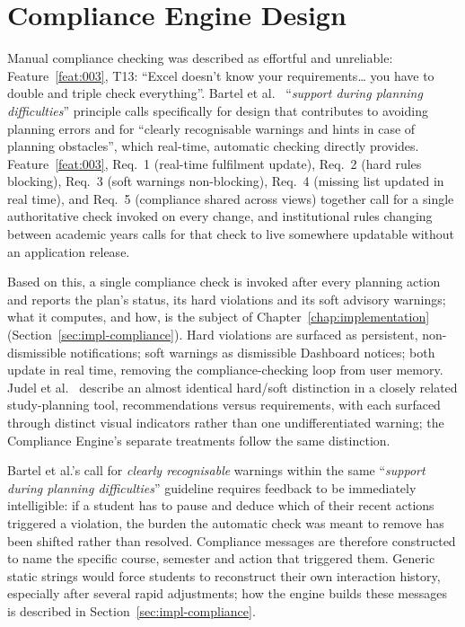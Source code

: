 \section{Compliance Engine Design}
\label{sec:compliance}
Manual compliance checking was described as effortful and unreliable: Feature~\ref{feat:003}, T13: \enquote{Excel doesn't know your requirements… you have to double and triple check everything}. Bartel et al.~\cite{bartel_design_2024} \enquote{\emph{support during planning difficulties}} principle calls specifically for design that contributes to avoiding planning errors and for \enquote{clearly recognisable warnings and hints in case of planning obstacles}, which real-time, automatic checking directly provides. Feature~\ref{feat:003}, Req.~1 (real-time fulfilment update), Req.~2 (hard rules blocking), Req.~3 (soft warnings non-blocking), Req.~4 (missing list updated in real time), and Req.~5 (compliance shared across views) together call for a single authoritative check invoked on every change, and institutional rules changing between academic years calls for that check to live somewhere updatable without an application release.

Based on this, a single compliance check is invoked after every planning action and reports the plan's status, its hard violations and its soft advisory warnings; what it computes, and how, is the subject of Chapter~\ref{chap:implementation} (Section~\ref{sec:impl-compliance}). Hard violations are surfaced as persistent, non-dismissible notifications; soft warnings as dismissible Dashboard notices; both update in real time, removing the compliance-checking loop from user memory. Judel et al.~\cite{judel_supporting_2023} describe an almost identical hard/soft distinction in a closely related study-planning tool, recommendations versus requirements, with each surfaced through distinct visual indicators rather than one undifferentiated warning; the Compliance Engine's separate treatments follow the same distinction.

Bartel et al.'s call for \emph{clearly recognisable} warnings within the same \enquote{\emph{support during planning difficulties}} guideline requires feedback to be immediately intelligible: if a student has to pause and deduce which of their recent actions triggered a violation, the burden the automatic check was meant to remove has been shifted rather than resolved. Compliance messages are therefore constructed to name the specific course, semester and action that triggered them. Generic static strings would force students to reconstruct their own interaction history, especially after several rapid adjustments; how the engine builds these messages is described in Section~\ref{sec:impl-compliance}.

